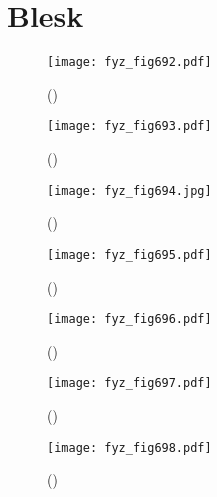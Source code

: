   \section{Blesk}\label{fyz:IIchapIXsecVI}


    \begin{figure}[ht!] %
      \centering
      \texttt{[image: fyz\_fig692.pdf]}
      \caption{
               (\cite[s.~707]{Feynman02})}
      \label{fyz:fig692}
    \end{figure}

    \begin{figure}[ht!] %
      \centering
      \texttt{[image: fyz\_fig693.pdf]}
      \caption{
               (\cite[s.~707]{Feynman02})}
      \label{fyz:fig693}
    \end{figure}

    \begin{figure}[ht!] %
      \centering
      \texttt{[image: fyz\_fig694.jpg]}
      \caption{
               (\cite[s.~707]{Feynman02})}
      \label{fyz:fig694}
    \end{figure}

    \begin{figure}[ht!] %
      \centering
      \texttt{[image: fyz\_fig695.pdf]}
      \caption{
               (\cite[s.~707]{Feynman02})}
      \label{fyz:fig695}
    \end{figure}

    \begin{figure}[ht!] %
      \centering
      \texttt{[image: fyz\_fig696.pdf]}
      \caption{
               (\cite[s.~707]{Feynman02})}
      \label{fyz:fig696}
    \end{figure}

    \begin{figure}[ht!] %
      \centering
      \texttt{[image: fyz\_fig697.pdf]}
      \caption{
               (\cite[s.~707]{Feynman02})}
      \label{fyz:fig697}
    \end{figure}

    \begin{figure}[ht!] %
      \centering
      \texttt{[image: fyz\_fig698.pdf]}
      \caption{
               (\cite[s.~707]{Feynman02})}
      \label{fyz:fig698}
    \end{figure}

